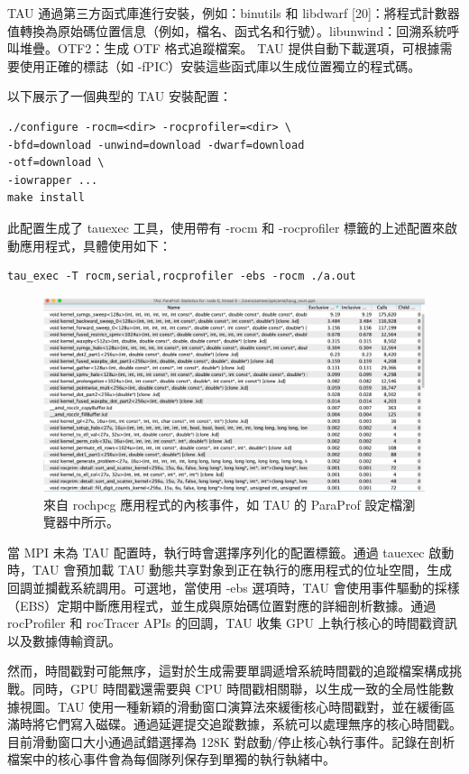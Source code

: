 TAU 通過第三方函式庫進行安裝，例如：binutils 和 libdwarf [20]：將程式計數器值轉換為原始碼位置信息（例如，檔名、函式名和行號）。libunwind：回溯系統呼叫堆疊。OTF2：生成 OTF 格式追蹤檔案。
TAU 提供自動下載選項，可根據需要使用正確的標誌（如 -fPIC）安裝這些函式庫以生成位置獨立的程式碼。

以下展示了一個典型的 TAU 安裝配置：
\begin{lstlisting}
.∕configure -rocm=<dir> -rocprofiler=<dir> \
-bfd=download -unwind=download -dwarf=download
-otf=download \
-iowrapper ...
make install
\end{lstlisting}

此配置生成了 tauexec 工具，使用帶有 -rocm 和 -rocprofiler 標籤的上述配置來啟動應用程式，具體使用如下：

\begin{lstlisting}
tau_exec -T rocm,serial,rocprofiler -ebs -rocm .∕a.out
\end{lstlisting}


\begin{figure}
    \centering
    \includegraphics[width=0.9\linewidth]{FileAusiliari/Screenshots/Figure13-17.png}
    \caption{來自 rochpcg 應用程式的內核事件，如 TAU 的 ParaProf 設定檔瀏覽器中所示。}
    \label{fig:PAPI17}
\end{figure}

當 MPI 未為 TAU 配置時，執行時會選擇序列化的配置標籤。通過 tauexec 啟動時，TAU 會預加載 TAU 動態共享對象到正在執行的應用程式的位址空間，生成回調並攔截系統調用。可選地，當使用 -ebs 選項時，TAU 會使用事件驅動的採樣（EBS）定期中斷應用程式，並生成與原始碼位置對應的詳細剖析數據。通過 rocProfiler 和 rocTracer APIs 的回調，TAU 收集 GPU 上執行核心的時間戳資訊以及數據傳輸資訊。

然而，時間戳對可能無序，這對於生成需要單調遞增系統時間戳的追蹤檔案構成挑戰。同時，GPU 時間戳還需要與 CPU 時間戳相關聯，以生成一致的全局性能數據視圖。TAU 使用一種新穎的滑動窗口演算法來緩衝核心時間戳對，並在緩衝區滿時將它們寫入磁碟。通過延遲提交追蹤數據，系統可以處理無序的核心時間戳。目前滑動窗口大小通過試錯選擇為 128K 對啟動/停止核心執行事件。記錄在剖析檔案中的核心事件會為每個隊列保存到單獨的執行執緒中。

